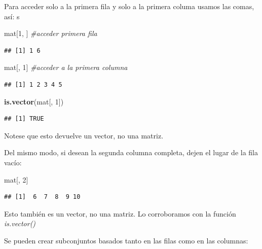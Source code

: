 \documentclass[
]{book}
\newenvironment{Shaded}{\begin{snugshade}}{\end{snugshade}}
\newcommand{\CommentTok}[1]{\textcolor[rgb]{0.56,0.35,0.01}{\textit{#1}}}
\newcommand{\DecValTok}[1]{\textcolor[rgb]{0.00,0.00,0.81}{#1}}
\newcommand{\FunctionTok}[1]{\textcolor[rgb]{0.13,0.29,0.53}{\textbf{#1}}}
\newcommand{\NormalTok}[1]{#1}
\begin{document}
Para acceder solo a la primera fila y solo a la primera columa usamos las comas, así: s

\begin{Shaded}
\begin{Highlighting}[]
\NormalTok{mat[}\DecValTok{1}\NormalTok{, ] }\CommentTok{\#acceder primera fila}
\end{Highlighting}
\end{Shaded}

\begin{verbatim}
## [1] 1 6
\end{verbatim}

\begin{Shaded}
\begin{Highlighting}[]
\NormalTok{mat[, }\DecValTok{1}\NormalTok{] }\CommentTok{\#acceder a la primera columna}
\end{Highlighting}
\end{Shaded}

\begin{verbatim}
## [1] 1 2 3 4 5
\end{verbatim}

\begin{Shaded}
\begin{Highlighting}[]
\FunctionTok{is.vector}\NormalTok{(mat[, }\DecValTok{1}\NormalTok{])}
\end{Highlighting}
\end{Shaded}

\begin{verbatim}
## [1] TRUE
\end{verbatim}

Notese que esto devuelve un vector, no una matriz.

Del mismo modo, si desean la segunda columna completa, dejen el lugar de la fila vacío:

\begin{Shaded}
\begin{Highlighting}[]
\NormalTok{mat[, }\DecValTok{2}\NormalTok{]}
\end{Highlighting}
\end{Shaded}

\begin{verbatim}
## [1]  6  7  8  9 10
\end{verbatim}

Esto también es un vector, no una matriz.
Lo corroboramos con la función \emph{is.vector()}

Se pueden crear subconjuntos basados tanto en las filas como en las columnas:
\end{document}
